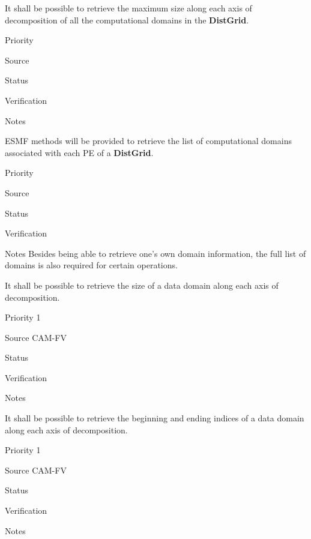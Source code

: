 
It shall be possible to retrieve the maximum size along each axis of
decomposition of all the computational domains in the \textbf{DistGrid}. 

\begin{reqlist}
\item[Priority] 
\item[Source] 
\item[Status]
\item[Verification]
\item[Notes]
\end{reqlist}


ESMF methods will be provided to retrieve the list of computational
domains associated with each PE of a  \textbf{DistGrid}.

\begin{reqlist}
\item[Priority] 
\item[Source]
\item[Status]
\item[Verification]
\item[Notes] Besides being able to retrieve one's own domain
  information, the full list of domains is also required for certain
  operations.
\end{reqlist}



It shall be possible to retrieve the size of a data domain
along each axis of decomposition.

\begin{reqlist}
\item[Priority] 1
\item[Source] CAM-FV
\item[Status]
\item[Verification]
\item[Notes]
\end{reqlist}


It shall be possible to retrieve the beginning and ending indices of a
data domain along each axis of decomposition.

\begin{reqlist}
\item[Priority] 1
\item[Source] CAM-FV
\item[Status]
\item[Verification]
\item[Notes]
\end{reqlist}

